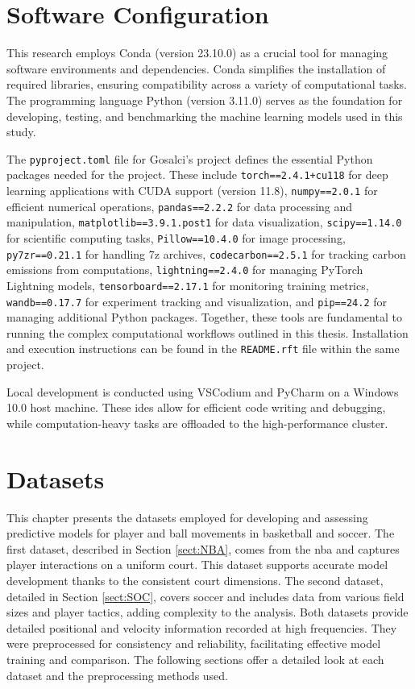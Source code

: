 \section{Software Configuration}
\label{sec:software}

This research employs Conda (version 23.10.0) as a crucial tool for managing software environments and dependencies. Conda simplifies the installation of required libraries, ensuring compatibility across a variety of computational tasks. The programming language Python (version 3.11.0) serves as the foundation for developing, testing, and benchmarking the machine learning models used in this study.

The \texttt{pyproject.toml} file for Gosalci's project \cite{Gosalci_master_den_2024} defines the essential Python packages needed for the project. These include \texttt{torch==2.4.1+cu118} for deep learning applications with CUDA support (version 11.8), \texttt{numpy==2.0.1} for efficient numerical operations, \texttt{pandas==2.2.2} for data processing and manipulation, \texttt{matplotlib==3.9.1.post1} for data visualization, \texttt{scipy==1.14.0} for scientific computing tasks, \texttt{Pillow==10.4.0} for image processing, \texttt{py7zr==0.21.1} for handling 7z archives, \texttt{codecarbon==2.5.1} for tracking carbon emissions from computations, \texttt{lightning==2.4.0} for managing PyTorch Lightning models, \texttt{tensorboard==2.17.1} for monitoring training metrics, \texttt{wandb==0.17.7} for experiment tracking and visualization, and \texttt{pip==24.2} for managing additional Python packages. Together, these tools are fundamental to running the complex computational workflows outlined in this thesis. Installation and execution instructions can be found in the \texttt{README.rft} file within the same project.

Local development is conducted using VSCodium and PyCharm on a Windows 10.0 host machine. These \glspl{ide} allow for efficient code writing and debugging, while computation-heavy tasks are offloaded to the high-performance cluster.



\section{Datasets}
\label{sec:data}

This chapter presents the datasets employed for developing and assessing predictive models for player and ball movements in basketball and soccer. The first dataset, described in Section \ref{sect:NBA}, comes from the \gls{nba} and captures player interactions on a uniform court. This dataset supports accurate model development thanks to the consistent court dimensions. The second dataset, detailed in Section \ref{sect:SOC}, covers soccer and includes data from various field sizes and player tactics, adding complexity to the analysis. Both datasets provide detailed positional and velocity information recorded at high frequencies. They were preprocessed for consistency and reliability, facilitating effective model training and comparison. The following sections offer a detailed look at each dataset and the preprocessing methods used.

